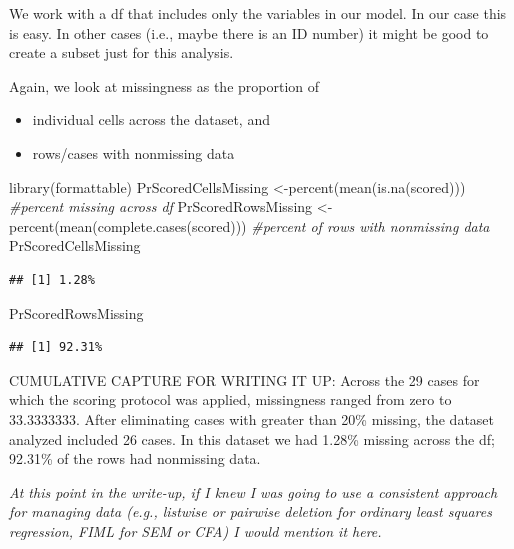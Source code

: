 \documentclass[
  english,
]{book}
\newenvironment{Shaded}{\begin{snugshade}}{\end{snugshade}}
\newcommand{\CommentTok}[1]{\textcolor[rgb]{0.56,0.35,0.01}{\textit{#1}}}
\newcommand{\FunctionTok}[1]{\textcolor[rgb]{0.00,0.00,0.00}{#1}}
\newcommand{\NormalTok}[1]{#1}
\newcommand{\OtherTok}[1]{\textcolor[rgb]{0.56,0.35,0.01}{#1}}
\providecommand{\tightlist}{%
  \setlength{\itemsep}{0pt}\setlength{\parskip}{0pt}}
\begin{document}
We work with a df that includes only the variables in our model. In our case this is easy. In other cases (i.e., maybe there is an ID number) it might be good to create a subset just for this analysis.

Again, we look at missingness as the proportion of

\begin{itemize}
\tightlist
\item
  individual cells across the dataset, and
\item
  rows/cases with nonmissing data
\end{itemize}

\begin{Shaded}
\begin{Highlighting}[]
\FunctionTok{library}\NormalTok{(formattable)}
\NormalTok{PrScoredCellsMissing }\OtherTok{\textless{}{-}}\FunctionTok{percent}\NormalTok{(}\FunctionTok{mean}\NormalTok{(}\FunctionTok{is.na}\NormalTok{(scored))) }\CommentTok{\#percent missing across df}
\NormalTok{PrScoredRowsMissing }\OtherTok{\textless{}{-}} \FunctionTok{percent}\NormalTok{(}\FunctionTok{mean}\NormalTok{(}\FunctionTok{complete.cases}\NormalTok{(scored))) }\CommentTok{\#percent of rows with nonmissing data}
\NormalTok{PrScoredCellsMissing}
\end{Highlighting}
\end{Shaded}

\begin{verbatim}
## [1] 1.28%
\end{verbatim}

\begin{Shaded}
\begin{Highlighting}[]
\NormalTok{PrScoredRowsMissing}
\end{Highlighting}
\end{Shaded}

\begin{verbatim}
## [1] 92.31%
\end{verbatim}

CUMULATIVE CAPTURE FOR WRITING IT UP: Across the 29 cases for which the scoring protocol was applied, missingness ranged from zero to 33.3333333. After eliminating cases with greater than 20\% missing, the dataset analyzed included 26 cases. In this dataset we had 1.28\% missing across the df; 92.31\% of the rows had nonmissing data.

\emph{At this point in the write-up, if I knew I was going to use a consistent approach for managing data (e.g., listwise or pairwise deletion for ordinary least squares regression, FIML for SEM or CFA) I would mention it here.}
\end{document}
